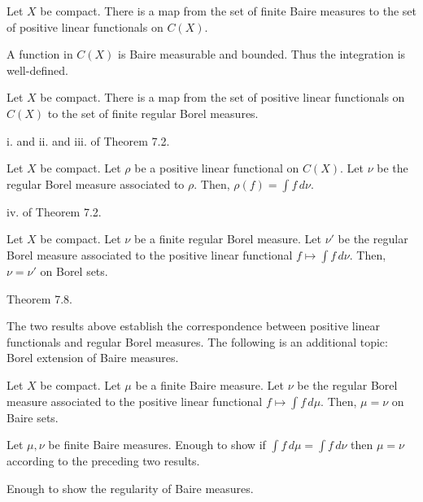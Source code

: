 \documentclass{../note}
\begin{document}
\begin{prb}
Let $X$ be compact.
There is a map from the set of finite Baire measures to the set of positive linear functionals on $C(X)$.
\end{prb}
\begin{sol}
A function in $C(X)$ is Baire measurable and bounded.
Thus the integration is well-defined.
\end{sol}

\begin{prb}
Let $X$ be compact.
There is a map from the set of positive linear functionals on $C(X)$ to the set of finite regular Borel measures.
\end{prb}
\begin{sol}
i. and ii. and iii. of Theorem 7.2.
\end{sol}

\begin{prb}
Let $X$ be compact.
Let $\rho$ be a positive linear functional on $C(X)$.
Let $\nu$ be the regular Borel measure associated to $\rho$.
Then, $\rho(f)=\int f\,d\nu$.
\end{prb}
\begin{sol}
iv. of Theorem 7.2.
\end{sol}

\begin{prb}
Let $X$ be compact.
Let $\nu$ be a finite regular Borel measure.
Let $\nu'$ be the regular Borel measure associated to the positive linear functional $f\mapsto\int f\,d\nu$.
Then, $\nu=\nu'$ on Borel sets.
\end{prb}
\begin{sol}
Theorem 7.8.
\end{sol}

The two results above establish the correspondence between positive linear functionals and regular Borel measures.
The following is an additional topic: Borel extension of Baire measures.
\begin{prb}
Let $X$ be compact.
Let $\mu$ be a finite Baire measure.
Let $\nu$ be the regular Borel measure associated to the positive linear functional $f\mapsto\int f\,d\mu$.
Then, $\mu=\nu$ on Baire sets.
\end{prb}
\begin{sol}
Let $\mu,\nu$ be finite Baire measures.
Enough to show if $\int f\,d\mu=\int f\,d\nu$ then $\mu=\nu$ according to the preceding two results.

Enough to show the regularity of Baire measures.
\end{sol}
\end{document}
